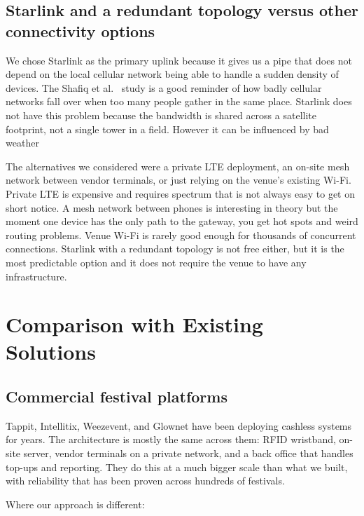\subsection{Starlink and a redundant topology versus other connectivity options}
\label{subsec:connectivity-tradeoff}

We chose Starlink as the primary uplink because it gives us a pipe that does not depend on the local cellular network being able to handle a sudden density of devices. The Shafiq et al.~\cite{Shafiq2013} study is a good reminder of how badly cellular networks fall over when too many people gather in the same place. Starlink does not have this problem because the bandwidth is shared across a satellite footprint, not a single tower in a field. However it can be influenced by bad weather

The alternatives we considered were a private LTE deployment, an on-site mesh network between vendor terminals, or just relying on the venue's existing Wi-Fi. Private LTE is expensive and requires spectrum that is not always easy to get on short notice. A mesh network between phones is interesting in theory but the moment one device has the only path to the gateway, you get hot spots and weird routing problems. Venue Wi-Fi is rarely good enough for thousands of concurrent connections. Starlink with a redundant topology is not free either, but it is the most predictable option and it does not require the venue to have any infrastructure.

\section{Comparison with Existing Solutions}
\label{sec:comparison}

\subsection{Commercial festival platforms}
\label{subsec:commercial-comparison}

Tappit, Intellitix, Weezevent, and Glownet have been deploying cashless systems for years. The architecture is mostly the same across them: RFID wristband, on-site server, vendor terminals on a private network, and a back office that handles top-ups and reporting. They do this at a much bigger scale than what we built, with reliability that has been proven across hundreds of festivals.

Where our approach is different:

